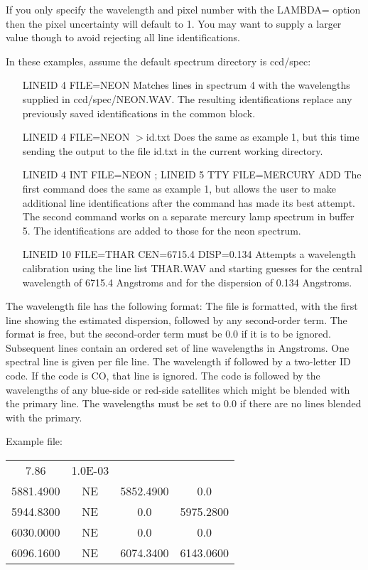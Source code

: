 If you only specify the wavelength and pixel number with the LAMBDA= option
then the pixel uncertainty will default to 1.  You may want to supply a
larger value though to avoid rejecting all line identifications.

In these examples, assume the default spectrum directory is 
ccd/spec:
\begin{itemize}
  \item[LINEID 4 FILE=NEON\hfill]{Matches lines in spectrum 4 with the
       wavelengths supplied in ccd/spec/NEON.WAV.  The resulting
       identifications replace any previously saved identifications in the
       common block.}

  \item[LINEID 4 FILE=NEON $>$id.txt\hfill]{Does the same as example 1, but
       this time sending the output to the file id.txt in the current
       working directory.}

  \item[LINEID 4 INT FILE=NEON ; LINEID 5 TTY FILE=MERCURY ADD\hfill]{The
       first command does the same as example 1, but allows the user to
       make additional line identifications after the command has made its
       best attempt.  The second command works on a separate mercury lamp
       spectrum in buffer 5.  The identifications are added to those for
       the neon spectrum.}

  \item[LINEID 10 FILE=THAR CEN=6715.4 DISP=0.134\hfill]{Attempts a
       wavelength calibration using the line list THAR.WAV and starting
       guesses for the central wavelength of 6715.4 Angstroms and for the
       dispersion of 0.134 Angstroms.}
\end{itemize}

The wavelength file has the following format: The file is formatted, with
the first line showing the estimated dispersion, followed by any
second-order term. The format is free, but the second-order term must be
0.0 if it is to be ignored.  Subsequent lines contain an ordered set of
line wavelengths in Angstroms.  One spectral line is given per file
line. The wavelength if followed by a two-letter ID code.  If the code is
CO, that line is ignored.  The code is followed by the wavelengths of any
blue-side or red-side satellites which might be blended with the primary
line.  The wavelengths must be set to 0.0 if there are no lines blended
with the primary.

Example file:
\begin{tabular}{cccc}
  7.86&1.0E-03&&\\
5881.4900 &NE& 5852.4900 &   0.0\\
5944.8300 &NE&    0.0    &5975.2800\\
6030.0000 &NE&    0.0    &   0.0\\
6096.1600 &NE& 6074.3400 &6143.0600\\
\end{tabular}

